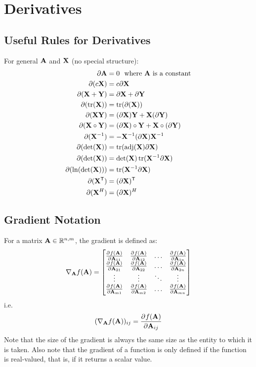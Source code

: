 
\chapter{Derivatives}

\section{Useful Rules for Derivatives}
For general $\mathbf{A}$ and $\mathbf{X}$ (no special structure):
\begin{align}
\partial\mathbf{A}           &= 0~~\textrm{where $\mathbf{A}$ is a constant} \\
\partial(c\mathbf{X})        &= c\partial\mathbf{X}                          \\
\partial(\mathbf{X}+\mathbf{Y})     &= \partial\mathbf{X}+\partial\mathbf{Y}               \\
\partial(\operatorname{tr}(\mathbf{X})) &= \operatorname{tr}(\partial(\mathbf{X}))                 \\
\partial(\mathbf{X}\mathbf{Y})      &= (\partial\mathbf{X})\mathbf{Y} + \mathbf{X}(\partial\mathbf{Y})   \\
\partial(\mathbf{X}\circ\mathbf{Y}) &= (\partial\mathbf{X})\circ\mathbf{Y} + \mathbf{X}\circ(\partial\mathbf{Y}) \\
\partial(\mathbf{X}^{-1})    &= -\mathbf{X}^{-1}(\partial\mathbf{X})\mathbf{X}^{-1}        \\
\partial(\det(\mathbf{X}))   &= \operatorname{tr}(\textrm{adj}(\mathbf{X})\partial\mathbf{X})  \\
\partial(\det(\mathbf{X}))   &= \det(\mathbf{X})\operatorname{tr}(\mathbf{X}^{-1}\partial\mathbf{X})  \\
\partial(\ln(\det(\mathbf{X}))) &= \operatorname{tr}(\mathbf{X}^{-1}\partial\mathbf{X})        \\
\partial(\mathbf{X}^{\mathsf{T}})       &= (\partial\mathbf{X})^\mathsf{T}                       \\
\partial(\mathbf{X}^H)       &= (\partial\mathbf{X})^H
\end{align}

\section{Gradient Notation}
For a matrix $\mathbf{A}\in\mathbb{R}^{n,m}$, the gradient is defined as:
\begin{equation}
\nabla_{\mathbf{A}} f(\mathbf{A})=
\begin{bmatrix}
\frac{\partial^{} f(\mathbf{A})}{\partial \mathbf{A}_{11}} & \frac{\partial^{} f(\mathbf{A})}{\partial \mathbf{A}_{12}} & \ldots & \frac{\partial^{} f(\mathbf{A})}{\partial \mathbf{A}_{1n}} \\
\frac{\partial^{} f(\mathbf{A})}{\partial \mathbf{A}_{21}} & \frac{\partial^{} f(\mathbf{A})}{\partial \mathbf{A}_{22}} & \ldots & \frac{\partial^{} f(\mathbf{A})}{\partial \mathbf{A}_{2n}} \\
\vdots                & \vdots                & \ddots & \vdots                \\
\frac{\partial^{} f(\mathbf{A})}{\partial \mathbf{A}_{m1}} & \frac{\partial^{} f(\mathbf{A})}{\partial \mathbf{A}_{m2}} & \ldots & \frac{\partial^{} f(\mathbf{A})}{\partial \mathbf{A}_{mn}}
\end{bmatrix}
\end{equation}
i.e.
\begin{equation}
(\nabla_{\mathbf{A}} f(\mathbf{A}))_{ij}=\frac{\partial^{} f(\mathbf{A})}{\partial \mathbf{A}_{ij}}
\end{equation}
Note that the size of the gradient is always the same size as the entity to which it is taken. Also note that the gradient of a function is only defined if the function is real-valued, that is, if it returns a scalar value.

